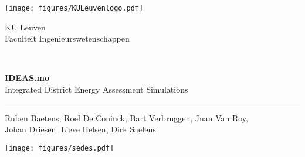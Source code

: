 
% 
 \thispagestyle{empty}   %
% 
 \noindent
 \begin{minipage}{3cm}%
   \texttt{[image: figures/KULeuvenlogo.pdf]}%
 \end{minipage}\hfill
 \begin{minipage}{8cm}
 \raggedleft
 \small{KU Leuven\\
 Faculteit Ingenieurswetenschappen}
 \end{minipage}
% 
\\[2cm]
   \begin{flushleft}
     \large \textbf{IDEAS.mo}\\
     \vspace{0.1in}\large{Integrated District Energy Assessment Simulations}%
   \end{flushleft}
 \hrule
% 
 \bigskip
   \large\noindent \small{Ruben Baetens, Roel De Coninck, Bart Verbruggen, Juan Van Roy, \\ Johan Driesen, Lieve Helsen, Dirk Saelens} \hfill
 \bigskip
% 
 \vfill
 \begin{minipage}{2.0cm}%
     \texttt{[image: figures/sedes.pdf]}%
 \end{minipage}\hfill
 \begin{minipage}{9cm}
 \raggedleft
 \end{minipage}

\clearpage{\pagestyle{empty}\cleardoublepage}
